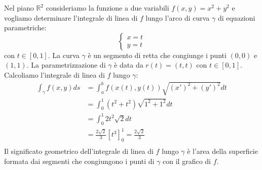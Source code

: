\documentclass[a4paper]{article}
\numberwithin{equation}{subsection}
\begin{document}
\ex{}
{
    Nel piano $\mathbb{R}^2$ consideriamo la funzione a due variabili $f(x,y) = x^2 + y^2$ e vogliamo determinare l'integrale di linea di $f$ lungo l'arco di curva $\gamma$ di equazioni parametriche:
    \[\begin{cases}
        x = t\\
        y = t 
    \end{cases}
    \]
    con $t \in [0,1]$. La curva $\gamma$ è un segmento di retta che congiunge i punti $(0,0)$ e $(1,1)$.
    La parametrizzazione di $\gamma$ è data da $r(t) = (t,t)$ con $t \in [0,1]$. Calcoliamo l'integrale di linea di $f$ lungo $\gamma$:
    \begin{align*}
        \int_{\gamma} f(x,y) ds &= \int_{a}^{b} f(x(t), y(t)) \sqrt{(x')^2 + (y')^2} dt\\
        &= \int_{0}^{1} (t^2 + t^2)\sqrt{1^2 + 1^2} dt\\
        &= \int_{0}^{1} 2t^2\sqrt{2} dt\\
        &= \frac{2\sqrt{2}}{3} [t^3]^1_0 = \frac{2\sqrt{2}}{3}\\
    \end{align*}
    \noindent
    Il significato geometrico dell'integrale di linea di $f$ lungo $\gamma$ è l'area della superficie formata dai segmenti che congiungono i punti di $\gamma$ con il grafico di $f$.


    \begin{figure}[H]
        \centering
\end{figure}}
\end{document}
